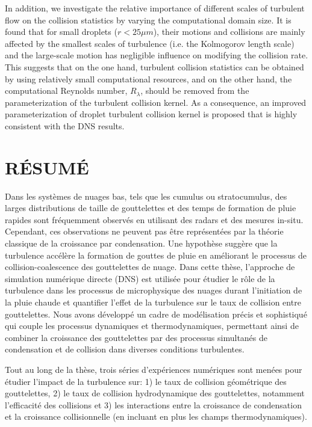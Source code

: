 \documentclass [12pt,letterpaper]{report}
\begin{document}
In addition, we investigate the relative importance of different scales of turbulent flow on the collision statistics by varying the computational domain size. It is found that for small droplets ($r < 25 \mu m$), their motions and collisions are mainly affected by the smallest scales of turbulence (i.e. the Kolmogorov length scale) and the large-scale motion has negligible influence on modifying the collision rate. This suggests that on the one hand, turbulent collision statistics can be obtained by using relatively small computational resources, and on the other hand, the computational Reynolds number, $R_\lambda$, should be removed from the parameterization of the turbulent collision kernel. As a consequence, an improved parameterization of droplet turbulent collision kernel is proposed that is highly consistent with the DNS results. 

\newpage

\section*{\centering R\'ESUM\'E}
Dans les syst\`emes de nuages bas, tels que les cumulus ou stratocumulus, des larges distributions de taille de gouttelettes et des temps de formation de pluie rapides sont fr\'equemment observ\'es en utilisant des radars et des mesures in-situ. Cependant, ces observations ne peuvent pas \^etre repr\'esent\'ees par la th\'eorie classique de la croissance par condensation. Une hypoth\`ese sugg\`ere que la turbulence acc\'el\`ere la formation de gouttes de pluie en am\'eliorant le processus de collision-coalescence des gouttelettes de nuage. Dans cette th\`ese, l'approche de simulation num\'erique directe (DNS) est utilis\'ee pour \'etudier le r\^ole de la turbulence dans les processus de microphysique des nuages durant l'initiation de la pluie chaude et quantifier l'effet de la turbulence sur le taux de collision entre gouttelettes. Nous avons d\'evelopp\'e un cadre de mod\'elisation pr\'ecis et sophistiqu\'e qui couple les processus dynamiques et thermodynamiques, permettant ainsi de combiner la croissance des gouttelettes par des processus simultan\'es de condensation et de collision dans diverses conditions turbulentes.

Tout au long de la th\`ese, trois s\'eries d'exp\'eriences num\'eriques sont men\'ees pour \'etudier l'impact de la turbulence sur: 1) le taux de collision g\'eom\'etrique des gouttelettes, 2) le taux de collision hydrodynamique des gouttelettes, notamment l'efficacit\'e des collisions et 3) les interactions entre la croissance de condensation et la croissance collisionnelle (en incluant en plus les champs thermodynamiques).
\end{document}

